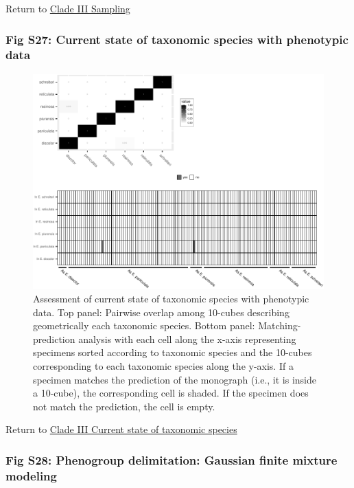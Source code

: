\documentclass[
  11pt,
]{article}
\begin{document}
Return to \protect\hyperlink{sampling-3}{Clade III Sampling}
\pagebreak

\hypertarget{fig-s27-current-state-of-taxonomic-species-with-phenotypic-data}{%
\subsubsection{Fig S27: Current state of taxonomic species with phenotypic data}\label{fig-s27-current-state-of-taxonomic-species-with-phenotypic-data}}

\begin{figure}
\includegraphics{Supplementary_Material_files/figure-latex/currentStateOfTaxonomyCladeIIIPlots-1} \caption{Assessment of current state of taxonomic species with phenotypic data. Top panel: Pairwise overlap among 10-cubes describing geometrically each taxonomic species. Bottom panel: Matching-prediction analysis with each cell along the x-axis representing specimens sorted according to taxonomic species and the 10-cubes corresponding to each taxonomic species along the y-axis. If a specimen matches the prediction of the monograph (i.e., it is inside a 10-cube), the corresponding cell is shaded. If the specimen does not match the prediction, the cell is empty.}\label{fig:currentStateOfTaxonomyCladeIIIPlots}
\end{figure}

Return to \protect\hyperlink{current-state-of-taxonomic-species-2}{Clade III Current state of taxonomic species}
\pagebreak

\hypertarget{fig-s28-phenogroup-delimitation-gaussian-finite-mixture-modeling}{%
\subsubsection{Fig S28: Phenogroup delimitation: Gaussian finite mixture modeling}\label{fig-s28-phenogroup-delimitation-gaussian-finite-mixture-modeling}}
\end{document}

